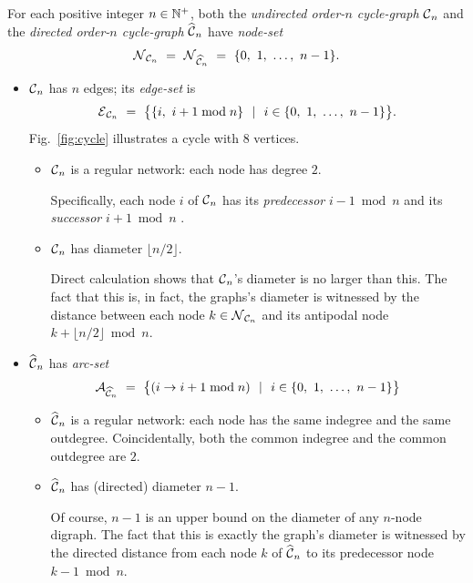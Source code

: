 For each positive integer $n \in \mathbb{N}^+$, both the {\it undirected
  order-$n$ cycle-graph} $\mbox{$\cal C$}_n$ and the {\it directed order-$n$
  cycle-graph} $\widehat{\mbox{$\cal C$}}_n$   have {\it node-set}
\[ \mbox{$\cal N$}_{{\cal C}_n} \ = \ \mbox{$\cal N$}_{\widehat{{\cal C}}_n}
\ = \ \{ 0, \ 1, \ \ldots, \ n-1\}. \]
\begin{itemize}
\item
$\mbox{$\cal C$}_n$ has $n$ edges; its {\it edge-set} is
\[ \mbox{$\cal E$}_{{\cal C}_n} \ = \
\big\{ \{i, \ i+1 \bmod n\} \ \ | \ \ i \in \{0, \ 1, \ \ldots,
\ n-1\} \big\}.
\]
Fig.~\ref{fig:cycle} illustrates a cycle with $8$ vertices.
  \begin{itemize}
  \item {}
$\mbox{$\cal C$}_n$ is a regular network: each node has degree $2$.

Specifically, each node $i$ of $\mbox{$\cal C$}_n$ has its {\it predecessor} $i-1
\bmod n$ \index{cycle graph!predecessor node}  and its {\it successor} $i+1 \bmod n$ .
  \item {}
$\mbox{$\cal C$}_n$ has diameter $\lfloor n/2 \rfloor$.

Direct calculation shows that $\mbox{$\cal C$}_n$'s diameter is no larger than
this.  The fact that this is, in fact, the graphs's diameter is
witnessed by the distance between each node $k \in \mbox{$\cal N$}_{{\cal C}_n}$
and its antipodal node $k + \lfloor n/2 \rfloor \bmod n$.
  \end{itemize}

\item
$\widehat{\mbox{$\cal C$}}_n$ has {\it arc-set}
\[ \a_{\widehat{{\cal C}}_n} \ = \ 
\big\{ (i \rightarrow i+1 \bmod n) \ \ | \ \ i \in \{0, \ 1, \ \ldots, \ n-1\} \big\}
\]
  \begin{itemize}
  \item {}
$\widehat{\mbox{$\cal C$}}_n$ is a regular network: each node has the same
    indegree and the same outdegree.  Coincidentally, both the common
    indegree and the common outdegree are $2$.
  \item
$\widehat{\mbox{$\cal C$}}_n$ has (directed) diameter $n-1$.

Of course, $n-1$ is an upper bound on the diameter of any $n$-node
digraph.  The fact that this is exactly the graph's diameter is
witnessed by the directed distance from each node $k$ of $\widehat
{\mbox{$\cal C$}}_n$ to its predecessor node $k-1 \bmod n$.
  \end{itemize}
\end{itemize}

